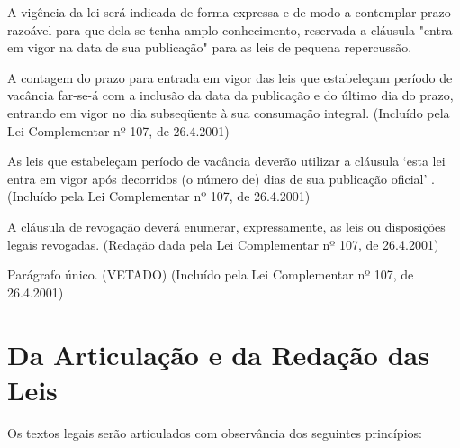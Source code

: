 \documentclass[a4paper,capitulo,titlepage=false]{br-lex}
\begin{document}
\artigo A vigência da lei será indicada de forma expressa e de modo a contemplar prazo razoável para que dela se tenha amplo conhecimento, reservada a cláusula "entra em vigor na data de sua publicação" para as leis de pequena repercussão.

\begin{paragrafos}

\paragrafo A contagem do prazo para entrada em vigor das leis que estabeleçam período de vacância far-se-á com a inclusão da data da publicação e do último dia do prazo, entrando em vigor no dia subseqüente à sua consumação integral.    (Incluído pela Lei Complementar nº 107, de 26.4.2001)

\paragrafo As leis que estabeleçam período de vacância deverão utilizar a cláusula ‘esta lei entra em vigor após decorridos (o número de) dias de sua publicação oficial’ .    (Incluído pela Lei Complementar nº 107, de 26.4.2001)

\end{paragrafos}


\artigo A cláusula de revogação deverá enumerar, expressamente, as leis ou disposições legais revogadas.    (Redação dada pela Lei Complementar nº 107, de 26.4.2001)

Parágrafo único. (VETADO)     (Incluído pela Lei Complementar nº 107, de 26.4.2001)

\section[Da Articulação e da Redação das Leis]{Da Articulação e da Redação das Leis}

\artigo Os textos legais serão articulados com observância dos seguintes princípios:
\end{document}
